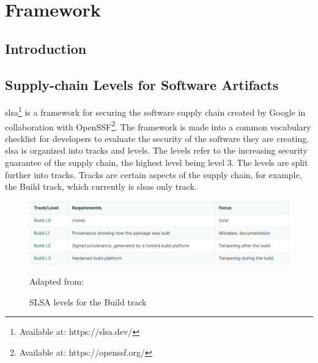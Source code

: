 \section{Framework}
\subsection{Introduction}


\subsection{Supply-chain Levels for Software Artifacts}
\acrlong{slsa}\footnote{Available at: https://slsa.dev/} is a framework for securing the software supply chain created by Google in collaboration with OpenSSF\footnote{Available at: https://openssf.org/}. The framework is made into a common vocabulary checklist for developers to evaluate the security of the software they are creating. \acrshort{slsa} is organized into tracks and levels. The levels refer to the increasing security guarantee of the supply chain, the highest level being level 3. The levels are split further into tracks. Tracks are certain aspects of the supply chain, for example, the Build track, which currently is \acrshort{slsa}s only track. \cite{SLSAgeneral}

\vspace{2mm}
\begin{figure}[H]
    \centering
    \includegraphics[width=0.8\columnwidth]{Images/slsalevels.png}
    \caption{SLSA levels for the Build track} Adapted from: \cite{SLSAlevels}
    \label{fig: SLSA levels for the Build track}
\end{figure}

